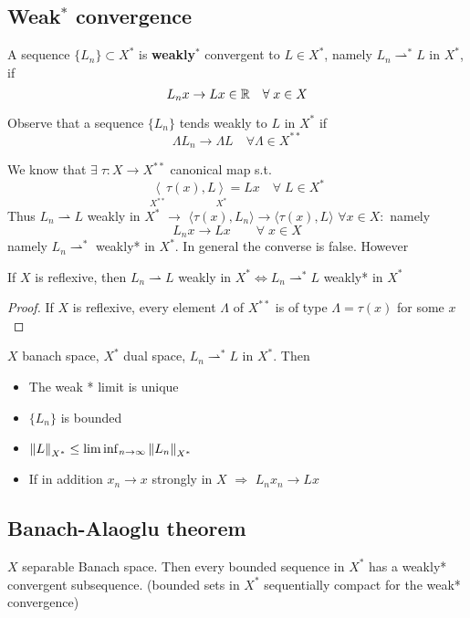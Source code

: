 \subsection{Weak\texorpdfstring{\({}^*\)}{*} convergence}
\begin{definition}
    A sequence \(\{L_n \} \subset X^*\) is \textbf{weakly\(^*\)} convergent to \(L \in  X^*\), namely \(L_n {\rightharpoonup}^* L\) in \(X^*\), if 
    \[
        L_n x \to Lx \in \mathbb{R} \quad \forall\; x \in X
    \]
\end{definition}
\begin{remark}
    Observe that a sequence \(\{L_n\} \) tends weakly to \(L\) in \(X^*\) if 
    \[
        \Lambda L_n \to \Lambda L \quad \forall \Lambda \in X^{**}
    \]
\end{remark}
We know that \(\exists \; \tau:X \to X^{**}\) canonical map s.t. 
\[
    \underset{X^{**}}{\langle}\tau(x), L \underset{X^*}{\rangle} = Lx \quad \forall \; L \in X^*
\]
Thus \(L_n \rightharpoonup L\) weakly in \(X^*\) \(\rightarrow\) \(\langle \tau(x), L_n \rangle \to \langle \tau(x), L \rangle\) \(\forall x \in X:\) namely
\[
    L_n x \to Lx \qquad \forall \; x \in X
\]
namely \(L_n\rightharpoonup^*\) weakly* in \(X^*\). In general the converse is false. However
\begin{proposition}
    If \(X\) is reflexive, then \(L_n \rightharpoonup L\) weakly in \(X^* \Leftrightarrow L_n \rightharpoonup^* L\) weakly* in \(X^*\)
\end{proposition}
\begin{proof}
    If \(X\) is reflexive, every element \(\Lambda\) of \(X^{**}\) is of type \(\Lambda = \tau(x)\) for some \(x\)
\end{proof}
\begin{proposition}
    \(X\) banach space, \(X^*\) dual space, \(L_n\rightharpoonup^* L\) in \(X^*\). Then
    \begin{itemize}
        \item The weak * limit is unique
        \item \(\{L_n\}\) is bounded
        \item \(\norm{L}_{X^*} \leq \liminf _{n \to \infty} \norm{L_n}_{X^*}\)
        \item If in addition \(x_n \to x\) strongly in \(X\) \(\Rightarrow\) \(L_nx_n \to Lx\) 
    \end{itemize}
\end{proposition}
\subsection{Banach-Alaoglu theorem}
\begin{theorem}
    \(X \) separable Banach space. Then every bounded sequence in \(X^*\) has a weakly* convergent subsequence. (bounded sets in \(X^* \) sequentially compact for the weak* convergence)
\end{theorem}

